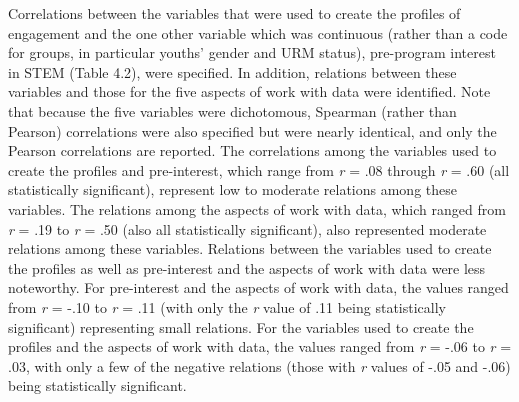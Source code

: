 \documentclass[]{msu-thesis}
\theoremstyle{definition}
\theoremstyle{definition}
\theoremstyle{definition}
\theoremstyle{remark}
\begin{document}
Correlations between the variables that were used to create the profiles
of engagement and the one other variable which was continuous (rather
than a code for groups, in particular youths' gender and URM status),
pre-program interest in STEM (Table 4.2), were specified. In addition,
relations between these variables and those for the five aspects of work
with data were identified. Note that because the five variables were
dichotomous, Spearman (rather than Pearson) correlations were also
specified but were nearly identical, and only the Pearson correlations
are reported. The correlations among the variables used to create the
profiles and pre-interest, which range from \emph{r} = .08 through
\emph{r} = .60 (all statistically significant), represent low to
moderate relations among these variables. The relations among the
aspects of work with data, which ranged from \emph{r} = .19 to \emph{r}
= .50 (also all statistically significant), also represented moderate
relations among these variables. Relations between the variables used to
create the profiles as well as pre-interest and the aspects of work with
data were less noteworthy. For pre-interest and the aspects of work with
data, the values ranged from \emph{r} = -.10 to \emph{r} = .11 (with
only the \emph{r} value of .11 being statistically significant)
representing small relations. For the variables used to create the
profiles and the aspects of work with data, the values ranged from
\emph{r} = -.06 to \emph{r} = .03, with only a few of the negative
relations (those with \emph{r} values of -.05 and -.06) being
statistically significant.
\end{document}
